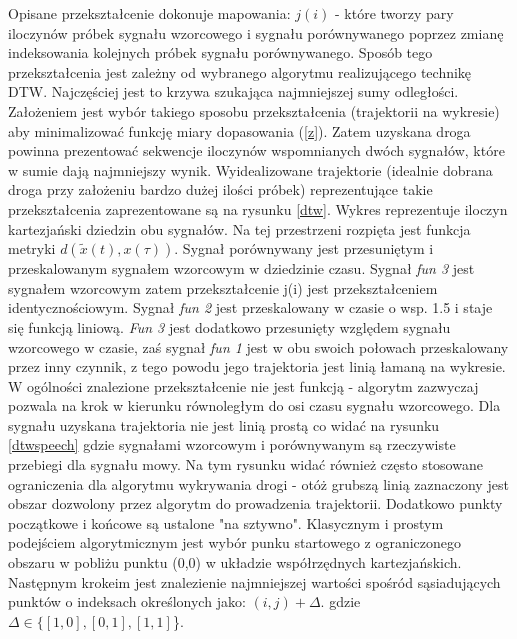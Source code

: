Opisane przekształcenie dokonuje mapowania: $j(i)$ - które tworzy pary iloczynów próbek sygnału wzorcowego i sygnału porównywanego poprzez zmianę indeksowania kolejnych próbek sygnału porównywanego. Sposób tego przekształcenia jest zależny od wybranego algorytmu realizującego technikę DTW. Najczęściej jest to krzywa szukająca najmniejszej sumy odległości. Założeniem jest wybór takiego sposobu przekształcenia (trajektorii na wykresie) aby minimalizować funkcję miary dopasowania (\ref{z}). Zatem
uzyskana droga powinna prezentować sekwencje iloczynów wspomnianych dwóch sygnałów, które w sumie dają najmniejszy wynik. Wyidealizowane trajektorie (idealnie dobrana droga przy założeniu bardzo dużej ilości próbek) reprezentujące takie przekształcenia zaprezentowane są na rysunku \ref{dtw}. Wykres reprezentuje iloczyn kartezjański dziedzin obu sygnałów. Na tej przestrzeni rozpięta jest funkcja metryki $d(\tilde{x}(t), x(\tau))$. Sygnał porównywany jest
przesuniętym i przeskalowanym sygnałem
wzorcowym w dziedzinie czasu. Sygnał \textit{fun 3} jest sygnałem wzorcowym zatem przekształcenie j(i) jest przekształceniem identycznościowym. Sygnał \textit{fun 2} jest przeskalowany w czasie o wsp. 1.5 i staje się funkcją liniową. \textit{Fun 3} jest dodatkowo przesunięty względem sygnału wzorcowego w czasie, zaś sygnał \textit{fun 1} jest w obu swoich połowach przeskalowany przez inny czynnik, z tego powodu jego trajektoria jest linią łamaną na wykresie. W ogólności znalezione
przekształcenie nie jest funkcją - algorytm zazwyczaj pozwala na krok w kierunku równoległym do osi czasu sygnału wzorcowego. Dla sygnału uzyskana trajektoria nie jest linią prostą co widać na rysunku \ref{dtwspeech} gdzie sygnałami wzorcowym i porównywanym są rzeczywiste przebiegi dla sygnału mowy. Na tym rysunku widać również często stosowane ograniczenia dla algorytmu wykrywania drogi - otóż grubszą linią zaznaczony jest obszar dozwolony przez algorytm do prowadzenia trajektorii. Dodatkowo
punkty początkowe i końcowe są ustalone "na sztywno". Klasycznym i prostym podejściem algorytmicznym jest wybór punku startowego z ograniczonego obszaru w pobliżu punktu (0,0) w układzie współrzędnych kartezjańskich. Następnym krokeim jest znalezienie najmniejszej wartości spośród sąsiadujących punktów o indeksach określonych jako: $(i, j) + \Delta.$ gdzie $ \Delta \in \{ [1,0], [0, 1], [1, 1]$\}. 
